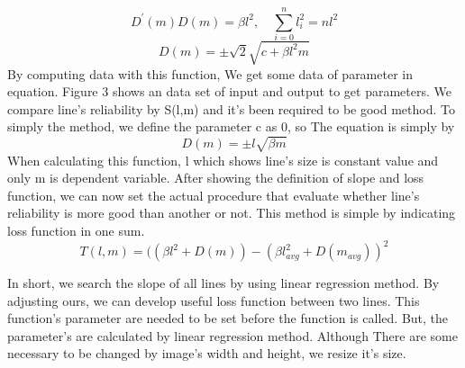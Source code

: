 {\begin{equation}
\mathit{{D}^{\prime}(m)D(m) = \beta{l}^{2},\quad\sum_{i=0}^{n}{{l}_{i}^{2}} = n{l}^{2}}
\end{equation}
\begin{equation}
\mathit{D(m)=\pm\sqrt{2}\sqrt{c+\beta{l}^{2}m}}
\end{equation}
By computing data with this function, We get some data of parameter in equation. Figure 3 shows an data set of input and output to get parameters. We compare line's reliability by S(l,m) and it's been required to be good method. To simply the method, we define the parameter c as 0, so The equation is simply by
\begin{equation}
\mathit{D(m)=\pm l\sqrt{\beta m}}
\end{equation}
When calculating this function, l which shows line's size is constant value and only m is dependent variable. After showing the definition of slope and loss function, we can now set the actual procedure that evaluate whether line's reliability is more good than another or not. This method is simple by indicating loss function in one sum.
\begin{equation}
\mathit{T(l,m) = ((\beta l^{2}+D(m)) - (\beta {l}_{avg}^{2}+D(m_{avg}))^{2}}
\end{equation}

In short, we search the slope of all lines by using linear regression method. By adjusting ours, we can develop useful loss function between two lines. This function's parameter are needed to be set before the function is called. But, the parameter's are calculated by linear regression method. Although There are some necessary to be changed by image's width and height, we resize it's size.
}